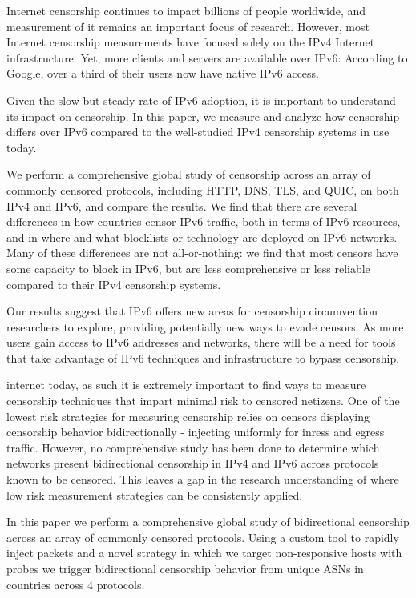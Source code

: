 
Internet censorship continues to impact billions of people worldwide,
and measurement of it remains an important focus of research.
However, most Internet censorship measurements have focused solely on the IPv4
Internet infrastructure. Yet, more clients and servers are available over IPv6:
According to Google, over a third of their users now have native IPv6 access.

Given the slow-but-steady rate of IPv6 adoption, it is important to understand
its impact on censorship. In this paper, we measure and analyze how censorship
differs over IPv6 compared to the well-studied IPv4 censorship systems in use
today.

We perform a comprehensive global study of censorship across an array of
commonly censored protocols, including HTTP, DNS, TLS, and QUIC, on both IPv4
and IPv6, and compare the results.
We find that there are several differences in how countries censor IPv6 traffic,
both in terms of IPv6 resources, and in where and what blocklists or technology
are deployed on IPv6 networks. Many of these differences are
not all-or-nothing: we find that most censors have some capacity to block
in IPv6, but are less comprehensive or less reliable compared to their IPv4
censorship systems.

Our results suggest that IPv6 offers new areas for censorship circumvention
researchers to explore, providing potentially new ways to evade censors. As more
users gain access to IPv6 addresses and networks, there will be a need for tools
that take advantage of IPv6 techniques and infrastructure to bypass censorship.



 internet today, as such
it is extremely important to find ways to measure censorship techniques that impart
minimal risk to censored netizens. One of the lowest risk strategies for measuring
censorship relies on censors displaying censorship behavior bidirectionally -
injecting uniformly for inress and egress traffic. However, no comprehensive
study has been done to determine which networks present bidirectional censorship
in IPv4 and IPv6 across protocols known to be censored. This leaves a gap in the
research understanding of where low risk measurement strategies can be
consistently applied.

In this paper we perform a comprehensive global study of bidirectional
censorship across an array of commonly censored protocols. Using a custom tool
to rapidly inject packets and a novel strategy in which we target non-responsive
hosts with probes we trigger bidirectional censorship behavior from
 unique ASNs in  countries across 4 protocols.

